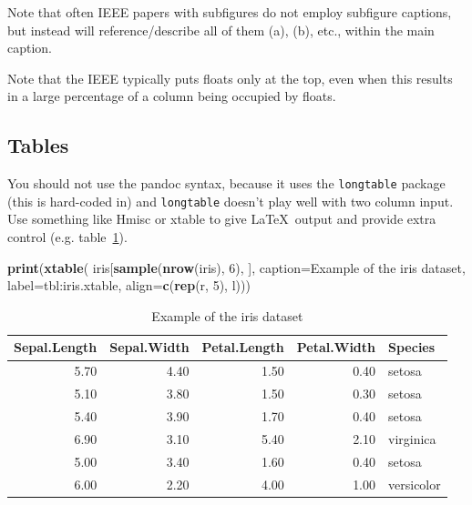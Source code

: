 \documentclass[a4paper,conference]{IEEEtran}
\newenvironment{Shaded}{\begin{snugshade}}{\end{snugshade}}
\newcommand{\AttributeTok}[1]{\textcolor[rgb]{0.13,0.29,0.53}{#1}}
\newcommand{\DecValTok}[1]{\textcolor[rgb]{0.00,0.00,0.81}{#1}}
\newcommand{\FunctionTok}[1]{\textcolor[rgb]{0.13,0.29,0.53}{\textbf{#1}}}
\newcommand{\NormalTok}[1]{#1}
\newcommand{\StringTok}[1]{\textcolor[rgb]{0.31,0.60,0.02}{#1}}
\begin{document}
Note that often IEEE papers with subfigures do not employ subfigure
captions, but instead will reference/describe all of them (a), (b),
etc., within the main caption.

Note that the IEEE typically puts floats only at the top, even when this
results in a large percentage of a column being occupied by floats.

\subsection{Tables}\label{sec:tables}

You should not use the pandoc syntax, because it uses the
\texttt{longtable} package (this is hard-coded in) and
\texttt{longtable} doesn't play well with two column input. Use
something like Hmisc or xtable to give \LaTeX~output and provide extra
control (e.g. table~\ref{tbl:iris.xtable}).

\begin{Shaded}
\begin{Highlighting}[]
\FunctionTok{print}\NormalTok{(}\FunctionTok{xtable}\NormalTok{(}
\NormalTok{  iris[}\FunctionTok{sample}\NormalTok{(}\FunctionTok{nrow}\NormalTok{(iris), }\DecValTok{6}\NormalTok{), ],}
  \AttributeTok{caption=}\StringTok{\textquotesingle{}Example of the iris dataset\textquotesingle{}}\NormalTok{,}
  \AttributeTok{label=}\StringTok{\textquotesingle{}tbl:iris.xtable\textquotesingle{}}\NormalTok{,}
  \AttributeTok{align=}\FunctionTok{c}\NormalTok{(}\FunctionTok{rep}\NormalTok{(}\StringTok{\textquotesingle{}r\textquotesingle{}}\NormalTok{, }\DecValTok{5}\NormalTok{), }\StringTok{\textquotesingle{}l\textquotesingle{}}\NormalTok{)))}
\end{Highlighting}
\end{Shaded}

\begin{table}[!t]
\centering
\caption{Example of the iris dataset} 
\label{tbl:iris.xtable}
\begin{tabular}{rrrrl}
  \hline
Sepal.Length & Sepal.Width & Petal.Length & Petal.Width & Species \\ 
  \hline
5.70 & 4.40 & 1.50 & 0.40 & setosa \\ 
  5.10 & 3.80 & 1.50 & 0.30 & setosa \\ 
  5.40 & 3.90 & 1.70 & 0.40 & setosa \\ 
  6.90 & 3.10 & 5.40 & 2.10 & virginica \\ 
  5.00 & 3.40 & 1.60 & 0.40 & setosa \\ 
  6.00 & 2.20 & 4.00 & 1.00 & versicolor \\ 
   \hline
\end{tabular}
\end{table}
\end{document}
